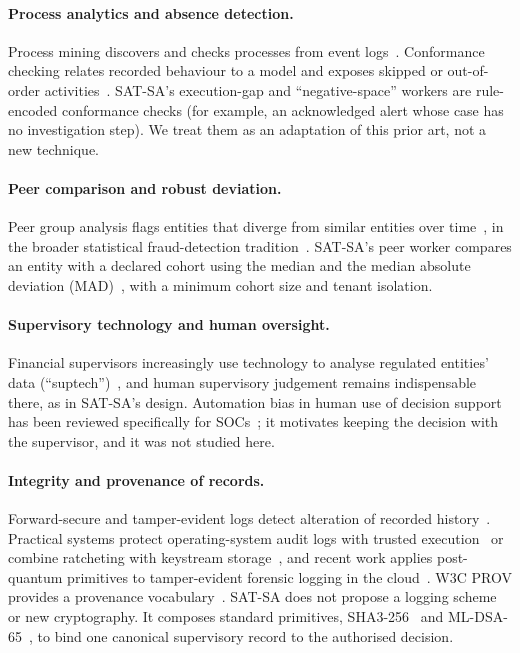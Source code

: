 \paragraph{Process analytics and absence detection.}
Process mining discovers and checks processes from event
logs~\cite{vanderaalst2016pm}. Conformance checking relates recorded behaviour to a
model and exposes skipped or out-of-order
activities~\cite{rozinat2008conformance,carmona2018conformance}. SAT-SA's
execution-gap and ``negative-space'' workers are rule-encoded conformance checks (for
example, an acknowledged alert whose case has no investigation step). We treat them
as an adaptation of this prior art, not a new technique.

\paragraph{Peer comparison and robust deviation.}
Peer group analysis flags entities that diverge from similar entities over
time~\cite{weston2008pga}, in the broader statistical fraud-detection
tradition~\cite{bolton2002fraud}. SAT-SA's peer worker compares an entity with a
declared cohort using the median and the median absolute deviation
(MAD)~\cite{leys2013mad}, with a minimum cohort size and tenant isolation.

\paragraph{Supervisory technology and human oversight.}
Financial supervisors increasingly use technology to analyse regulated entities'
data (``suptech'')~\cite{broeders2018suptech}, and human supervisory judgement
remains indispensable there, as in SAT-SA's design. Automation bias in human use of
decision support~\cite{parasuraman2010automation} has been reviewed specifically for
SOCs~\cite{tilbury2024automationbias}; it motivates keeping the decision with the
supervisor, and it was not studied here.

\paragraph{Integrity and provenance of records.}
Forward-secure and tamper-evident logs detect alteration of recorded
history~\cite{schneier1999logs,crosby2009logging}. Practical systems protect
operating-system audit logs with trusted execution~\cite{paccagnella2020custos} or
combine ratcheting with keystream storage~\cite{guardiola2022sealfs}, and recent work
applies post-quantum primitives to tamper-evident forensic logging in the
cloud~\cite{fugkeaw2026pqabl}. W3C PROV provides a provenance
vocabulary~\cite{w3c2013provdm}. SAT-SA does not propose a logging scheme or new
cryptography. It composes standard primitives, SHA3-256~\cite{nist2015fips202} and
ML-DSA-65~\cite{nist2024fips204}, to bind one canonical supervisory record to the
authorised decision.

